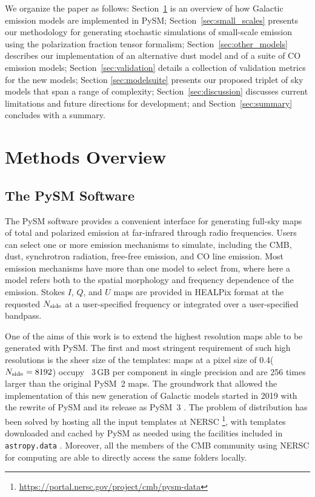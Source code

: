 \documentclass[twocolumn]{aastex631}
\begin{document}
We organize the paper as follows: Section~\ref{sec:methods} is an overview of how Galactic emission models are implemented in PySM; Section~\ref{sec:small_scales} presents our methodology for generating stochastic simulations of small-scale emission using the polarization fraction tensor formalism; Section~\ref{sec:other_models} describes our implementation of an alternative dust model and of a suite of CO emission models; Section~\ref{sec:validation} details a collection of validation metrics for the new models; Section \ref{sec:modelsuite} presents our proposed triplet of sky models that span a range of complexity; Section~\ref{sec:discussion} discusses current limitations and future directions for development; and Section~\ref{sec:summary} concludes with a summary.

\section{Methods Overview} \label{sec:methods}

\subsection{The PySM Software}
The PySM software provides a convenient interface for generating full-sky maps of total and polarized emission at far-infrared through radio frequencies. Users can select one or more emission mechanisms to simulate, including the CMB, dust, synchrotron radiation, free-free emission, and CO line emission. Most emission mechanisms have more than one model to select from, where here a model refers both to the spatial morphology and frequency dependence of the emission. Stokes $I$, $Q$, and $U$ maps are provided in HEALPix \citep{Gorski:2005} format at the requested $N_{\rm side}$ at a user-specified frequency or integrated over a user-specified bandpass.

One of the aims of this work is to extend the highest resolution maps able to be generated with PySM. The first and most stringent requirement of such high resolutions is the sheer size of the templates: maps at a pixel size of 0.4\arcmin ($N_{\rm side}=8192$) occupy ~3\,GB per component in single precision and are 256 times larger than the original PySM~2 maps. The groundwork that allowed the implementation of this new generation of Galactic models started in 2019 with the rewrite of PySM and its release as PySM~3 \citep[see][for details]{Zonca:2021}. The problem of distribution has been solved by hosting all the input templates at NERSC \footnote{\url{https://portal.nersc.gov/project/cmb/pysm-data}}, with templates downloaded and cached by PySM as needed using the facilities included in \texttt{astropy.data} \citep{AstropyCollaboration:2013, AstropyCollaboration:2018}. Moreover, all the members of the CMB community using NERSC for computing are able to directly access the same folders locally.
\end{document}
